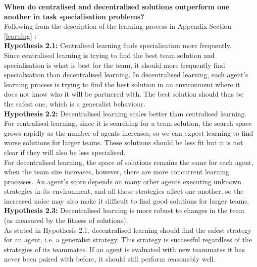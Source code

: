 \documentclass[12pt]{article}
\begin{document}
\textbf{When do centralised and decentralised solutions outperform one another in task specialisation problems?}\\

Following from the description of the learning process in Appendix Section \ref{learning} :\\

\textbf{Hypothesis 2.1:} Centralised learning finds specialisation more frequently. \\

Since centralised learning is trying to find the best team solution and specialisation is what is best for the team, it should more frequently find specialisation than decentralised learning. 
In decentralised learning, each agent’s learning process is trying to find the best solution in an environment where it does not know who it will be partnered with. 
The best solution should thus be the safest one, which is a generalist behaviour.\\

\textbf{Hypothesis 2.2:} Decentralised learning scales better than centralised learning. \\

For centralised learning, since it is searching for a team solution, the search space grows rapidly as the number of agents increases, so we can expect learning to find worse solutions for larger teams. 
These solutions should be less fit but it is not clear if they will also be less specialised.\\

For decentralised learning, the space of solutions remains the same for each agent, when the team size increases, however, there are more concurrent learning processes. 
An agent’s score depends on many other agents executing unknown strategies in its environment, and all those strategies affect one another, so the increased noise may also make it difficult to find good solutions for larger teams.\\

\textbf{Hypothesis 2.3:} Decentralised learning is more robust to changes in the team (as measured by the fitness of solutions).\\

As stated in Hypothesis 2.1, decentralised learning should find the safest strategy for an agent, i.e. a generalist strategy. This strategy is successful regardless of the strategies of its teammates. If an agent is evaluated with new teammates it has never been paired with before, it should still perform reasonably well. \\
\end{document}
